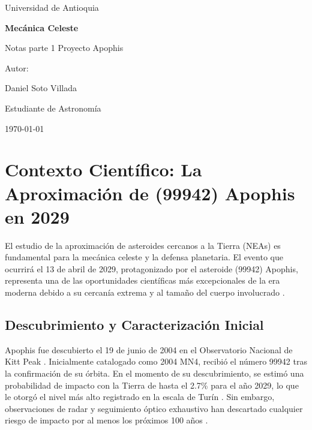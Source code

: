 \documentclass[a4paper]{article}
\begin{document}
\begin{titlepage}
  \centering
  {\Large Universidad de Antioquia\par}
  \vspace{2cm}
  {\huge\bfseries Mecánica Celeste\par}
  \vspace{0.4cm}
  {\Large Notas parte 1 Proyecto Apophis\par}
  \vspace{2.5cm}
  {\large Autor:\par}
  \vspace{0.2cm}
  {\large Daniel Soto Villada\par}
  {\large Estudiante de Astronomía\par}
  \vfill
  {\large \today\par}
\end{titlepage}

\newpage
\tableofcontents
\newpage

\section{Contexto Científico: La Aproximación de (99942) Apophis en 2029}

El estudio de la aproximación de asteroides cercanos a la Tierra (NEAs) es fundamental para la mecánica celeste y la defensa planetaria. El evento que ocurrirá el 13 de abril de 2029, protagonizado por el asteroide (99942) Apophis, representa una de las oportunidades científicas más excepcionales de la era moderna debido a su cercanía extrema y al tamaño del cuerpo involucrado \cite{nasa2025apophisfacts, esa2024apophis}.

\subsection{Descubrimiento y Caracterización Inicial}
Apophis fue descubierto el 19 de junio de 2004 en el Observatorio Nacional de Kitt Peak \cite{nasa2025apophisfacts, jpl2024sbdb}. Inicialmente catalogado como 2004 MN4, recibió el número 99942 tras la confirmación de su órbita. En el momento de su descubrimiento, se estimó una probabilidad de impacto con la Tierra de hasta el 2.7\% para el año 2029, lo que le otorgó el nivel más alto registrado en la escala de Turín \cite{esa2024apophis, vallejo2022conditions}. Sin embargo, observaciones de radar y seguimiento óptico exhaustivo han descartado cualquier riesgo de impacto por al menos los próximos 100 años \cite{nasa2025apophisfacts, broz2026apophis, esa2024apophis}.
\end{document}
